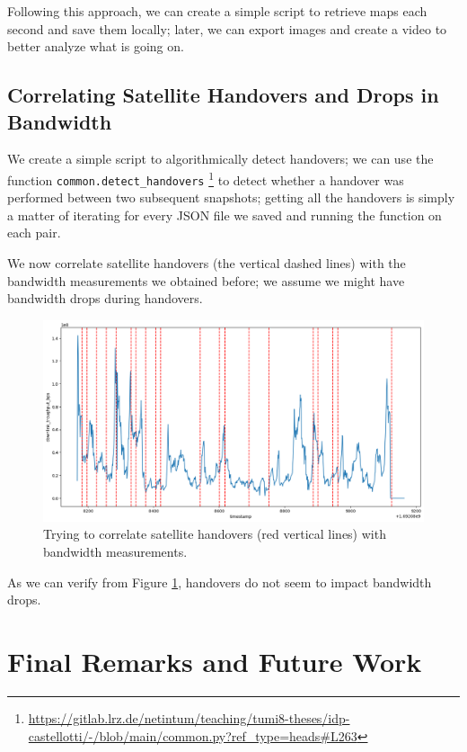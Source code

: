 \documentclass[IN,11pt,twoside,openright,idp,english]{tumthesis}
\begin{document}
Following this approach, we can create a simple script to retrieve maps each second and save them locally; later, we can export images and create a video to better analyze what is going on. 

\section{Correlating Satellite Handovers and Drops in Bandwidth}
\label{sec:sat-hand-drop}

We create a simple script to algorithmically detect handovers; we can use the function \texttt{common.detect\_handovers} \footnote{\url{https://gitlab.lrz.de/netintum/teaching/tumi8-theses/idp-castellotti/-/blob/main/common.py?ref_type=heads\#L263}} to detect whether a handover was performed between two subsequent snapshots; getting all the handovers is simply a matter of iterating for every JSON file we saved and running the function on each pair.

We now correlate satellite handovers (the vertical dashed lines) with the bandwidth measurements we obtained before; we assume we might have bandwidth drops during handovers. 

\begin{figure}
    \centering
    \includegraphics[width=1\columnwidth]{img/correlation_handovers_bw.png}
    \caption{Trying to correlate satellite handovers (red vertical lines) with bandwidth measurements.}
    \label{fig:vis-correlation-handovers}
\end{figure}

As we can verify from Figure \ref{fig:vis-correlation-handovers}, handovers do not seem to impact bandwidth drops.


\chapter{Final Remarks and Future Work}
\end{document}
